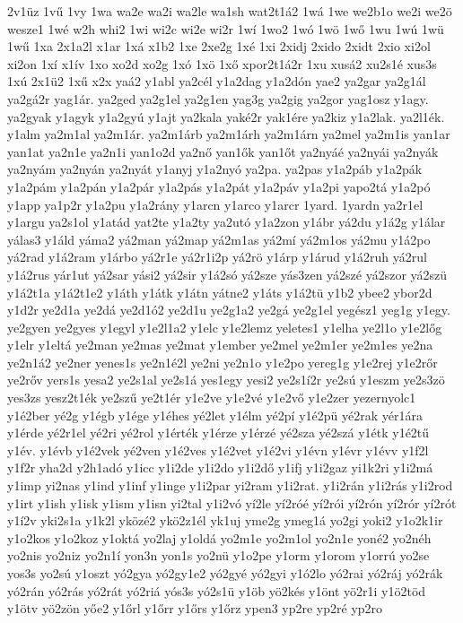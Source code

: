 {2v1üz
1vű
1vy
1wa
wa2e
wa2i
wa2le
wa1sh
wat2t1á2
1wá
1we
we2b1o
we2i
we2ö
wesze1
1wé
w2h
whi2
1wi
wi2c
wi2e
wi2r
1wí
1wo2
1wó
1wö
1wő
1wu
1wú
1wü
1wű
1xa
2x1a2l
x1ar
1xá
x1b2
1xe
2xe2g
1xé
1xi
2xidj
2xido
2xidt
2xio
xi2ol
xi2on
1xí
x1ív
1xo
xo2d
xo2g
1xó
1xö
1xő
xpor2t1á2r
1xu
xusá2
xu2s1é
xus3s
1xú
2x1ü2
1xű
x2x
yaá2
y1abl
ya2cél
y1a2dag
y1a2dón
yae2
ya2gar
ya2g1ál
ya2gá2r
yag1ár.
ya2ged
ya2g1el
ya2g1en
yag3g
ya2gig
ya2gor
yag1osz
y1agy.
ya2gyak
y1agyk
y1a2gyú
y1ajt
ya2kala
yaké2r
yak1ére
ya2kiz
y1a2lak.
ya2l1ék.
y1alm
ya2m1al
ya2m1ár.
ya2m1árb
ya2m1árh
ya2m1árn
ya2mel
ya2m1is
yan1ar
yan1at
ya2n1e
ya2n1i
yan1o2d
ya2nő
yan1ők
yan1őt
ya2nyáé
ya2nyái
ya2nyák
ya2nyám
ya2nyán
ya2nyát
y1anyj
y1a2nyó
ya2pa.
ya2pas
y1a2páb
y1a2pák
y1a2pám
y1a2pán
y1a2pár
y1a2pás
y1a2pát
y1a2páv
y1a2pi
yapo2tá
y1a2pó
y1app
ya1p2r
y1a2pu
y1a2rány
y1arcn
y1arco
y1arcr
1yard.
1yardn
ya2r1el
y1argu
ya2s1ol
y1atád
yat2te
y1a2ty
ya2utó
y1a2zon
y1ábr
yá2du
y1á2g
y1álar
yálas3
y1áld
yáma2
yá2man
yá2map
yá2m1as
yá2mí
yá2m1os
yá2mu
y1á2po
yá2rad
y1á2ram
y1árbo
yá2r1e
yá2r1i2p
yá2rö
y1árp
y1árud
y1á2ruh
yá2rul
y1á2rus
yár1ut
yá2sar
yási2
yá2sir
y1á2só
yá2sze
yás3zen
yá2szé
yá2szor
yá2szü
y1á2t1a
y1á2t1e2
y1áth
y1átk
y1átn
yátne2
y1áts
y1á2tü
y1b2
ybee2
ybor2d
y1d2r
ye2d1a
ye2dá
ye2d1ó2
ye2d1u
ye2g1a2
ye2gá
ye2g1el
yegész1
yeg1g
y1egy.
ye2gyen
ye2gyes
y1egyl
y1e2l1a2
y1elc
y1e2lemz
yeletes1
y1elha
ye2l1o
y1e2lőg
y1elr
y1eltá
ye2man
ye2mas
ye2mat
y1ember
ye2mel
ye2m1er
ye2m1es
ye2na
ye2n1á2
ye2ner
yenes1s
ye2n1é2l
ye2ni
ye2n1o
y1e2po
yereg1g
y1e2rej
y1e2rőr
ye2rőv
yers1s
yesa2
ye2s1al
ye2s1á
yes1egy
yesi2
ye2s1í2r
ye2sú
y1eszm
ye2s3zö
yes3zs
yesz2t1ék
ye2szű
ye2t1ér
y1e2ve
y1e2vé
y1e2vő
y1e2zer
yezernyolc1
y1é2ber
yé2g
y1égb
y1ége
y1éhes
yé2let
y1élm
yé2pí
y1é2pü
yé2rak
yér1ára
y1érde
yé2r1el
yé2ri
yé2rol
y1érték
y1érze
y1érzé
yé2sza
yé2szá
y1étk
y1é2tű
y1év.
y1évb
y1é2vek
yé2ven
y1é2ves
y1é2vet
y1é2vi
y1évn
y1évr
y1évv
y1f2l
y1f2r
yha2d
y2h1adó
y1icc
y1i2de
y1i2do
y1i2dő
y1ifj
y1i2gaz
yi1k2ri
y1i2má
y1imp
yi2nas
y1ind
y1inf
y1inge
y1i2par
yi2ram
y1i2rat.
y1i2rán
y1i2rás
y1i2rod
y1irt
y1ish
y1isk
y1ism
y1isn
yi2tal
y1i2vó
yí2le
yí2róé
yí2rói
yí2rón
yí2rór
yí2rót
y1í2v
yki2s1a
y1k2l
yközé2
ykö2z1él
yk1uj
yme2g
ymeg1á
yo2gi
yoki2
y1o2k1ir
y1o2kos
y1o2koz
y1oktá
yo2laj
y1oldá
yo2m1e
yo2m1ol
yo2n1e
yoné2
yo2néh
yo2nis
yo2niz
yo2n1í
yon3n
yon1s
yo2nü
y1o2pe
y1orm
y1orom
y1orrú
yo2se
yos3s
yo2sú
y1oszt
yó2gya
yó2gy1e2
yó2gyé
yó2gyi
y1ó2lo
yó2rai
yó2ráj
yó2rák
yó2rán
yó2rás
yó2rát
yó2riá
yós3s
yó2s1ü
y1öb
yö2kés
y1önt
yö2r1i
y1ö2töd
y1ötv
yö2zön
yőe2
y1őrl
y1őrr
y1őrs
y1őrz
ypen3
yp2re
yp2ré
yp2ro
}
